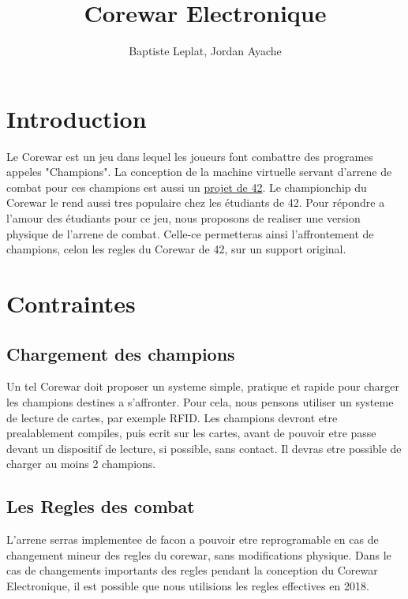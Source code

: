 \documentclass[12pt,a4paper,titlepage]{article}
\title{Corewar Electronique}
\date{}
\author{Baptiste Leplat, Jordan Ayache}
\begin{document}
    \maketitle
    \tableofcontents

      \section{Introduction}

Le Corewar est un jeu dans lequel les joueurs font combattre des programes appeles "Champions".
La conception de la machine virtuelle servant d'arrene de combat pour ces champions est aussi un \href{https://projects.intra.42.fr/projects/corewar}{projet de 42}.  
Le championchip du Corewar le rend aussi tres populaire chez les étudiants de 42. Pour répondre a l'amour des étudiants pour ce jeu, nous proposons de realiser une version physique de l'arrene de combat. Celle-ce permetteras ainsi l'affrontement de champions, celon les regles du Corewar de 42, sur un support original.  

      \section{Contraintes}

        \subsection{Chargement des champions}

Un tel Corewar doit proposer un systeme simple, pratique et rapide pour charger les champions destines a s'affronter.  
Pour cela, nous pensons utiliser un systeme de lecture de cartes, par exemple RFID.
Les champions devront etre prealablement compiles, puis ecrit sur les cartes, avant de pouvoir etre passe devant un dispositif de lecture, si possible, sans contact.  
Il devras etre possible de charger au moins 2 champions.  

        \subsection{Les Regles des combat}

L'arrene serras implementee de facon a pouvoir etre reprogramable en cas de changement mineur des regles du corewar, sans modifications physique.  
Dans le cas de changements importants des regles pendant la conception du Corewar Electronique, il est possible que nous utilisions les regles effectives en 2018.  
\end{document}
